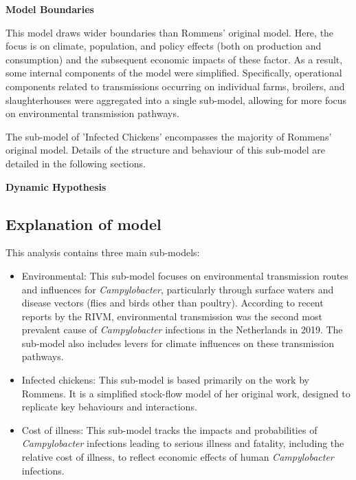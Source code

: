 \textbf{Model Boundaries}

This model draws wider boundaries than Rommens' original model. Here, the focus is on climate, population, and policy effects (both on production and consumption) and the subsequent economic impacts of these factor. As a result, some internal components of the model were simplified. Specifically, operational components related to transmissions occurring on individual farms, broilers, and slaughterhouses were aggregated into a single sub-model, allowing for more focus on environmental transmission pathways.

The sub-model of 'Infected Chickens' encompasses the majority of Rommens' original model. Details of the structure and behaviour of this sub-model are detailed in the following sections. 

\textbf{Dynamic Hypothesis}

\subsection{Explanation of model}
   
This analysis contains three main sub-models:

\begin{itemize}
    \item Environmental: This sub-model focuses on environmental transmission routes and influences for \textit{Campylobacter}, particularly through surface waters and disease vectors (flies and birds other than poultry). According to recent reports by the RIVM, environmental transmission was the second most prevalent cause of \textit{Campylobacter} infections in the Netherlands in 2019. The sub-model also includes levers for climate influences on these transmission pathways.
    \item Infected chickens: This sub-model is based primarily on the work by Rommens. It is a simplified stock-flow model of her original work, designed to replicate key behaviours and interactions.
    \item Cost of illness: This sub-model tracks the impacts and probabilities of \textit{Campylobacter} infections leading to serious illness and fatality, including the relative cost of illness, to reflect economic effects of human \textit{Campylobacter} infections.

\end{itemize}

